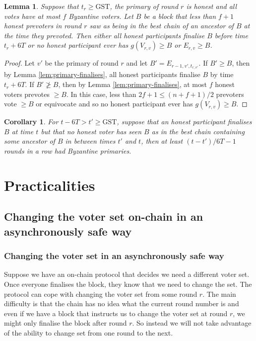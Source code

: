 \documentclass{article}
\newtheorem{lemma}[theorem]{Lemma}
\newtheorem{corollary}[theorem]{Corollary}
\def\GST{\mathrm{GST}}
\begin{document}
\begin{lemma} \label{lem:honest-recent-validity}
Suppose that $t_r \geq \GST$, the primary of round $r$ is honest and all votes have at most $f$ Byzantine voters.
Let $B$ be a block that less than $f+1$ honest prevoters in round $r$ saw as being in the best chain of an ancestor of $B$ at the time they prevoted.
Then either all honest participants finalise $B$ before time $t_r+6T$ or no honest participant ever has $g(V_{r,v}) \geq B$ or $E_{r,v} \geq B$.
\end{lemma}

\begin{proof} Let $v'$ be the primary of round $r$ and let $B'=E_{r-1,v',t_{r,v'}}$. If $B' \geq B$, then by Lemma \ref{lem:primary-finalises}, all honest participants finalise $B$ by time $t_r+6T$. If $B' \not\geq B$, then by Lemma \ref{lem:primary-finalises}, at most $f$ honest voters prevotes $\geq B$. In this case, less than $2f+1 \leq (n+f+1)/2$ prevoters vote $\geq B$ or equivocate and so no honest participant ever has $g(V_{r,v}) \geq B$.
\end{proof}


\begin{corollary} For $t - 6T > t' \geq \GST$, suppose that an honest participant finalises $B$ at time $t$ but that no honest voter has seen $B$ as in the best chain containing some ancestor of $B$ in between times $t'$ and $t$, then at least $(t-t')/6T - 1$ rounds in a row had Byzantine primaries. \end{corollary}




\section{Practicalities}

\subsection{Changing the voter set on-chain in an asynchronously safe way}

\subsubsection{Changing the voter set in an asynchronously safe way}

Suppose we have an on-chain protocol that decides we need a different voter set. Once everyone finalises the block, they know that we need to change the set. The protocol can cope with changing the voter set from some round $r$.
The main difficulty is that the chain has no idea what the current round number is and even if we have a block that instructs us to change the voter set at round $r$, we might only finalise the block after round $r$.
So instead we will not take advantage of the ability to change set from one round to the next. 
\end{document}
